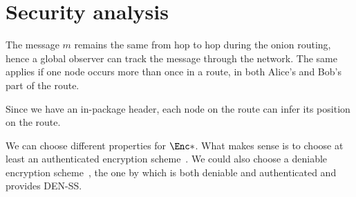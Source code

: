\section{Security analysis}%
\label{SecurityAnalysis}


The message \(m\) remains the same from hop to hop during the onion routing, 
hence a global observer can track the message through the network.
The same applies if one node occurs more than once in a route, \eg in both 
Alice's and Bob's part of the route.

Since we have an in-package header, each node on the route can infer its 
position on the route.

We can choose different properties for \(\Enc*\).
What makes sense is to choose at least an authenticated encryption 
scheme~\cite{AuthEncryption}.
We could also choose a deniable encryption scheme~\cite{DeniableEncryption}, \eg 
the one by \textcite{OTPKX} which is both deniable and authenticated and 
provides \ac{DEN-SS}.
